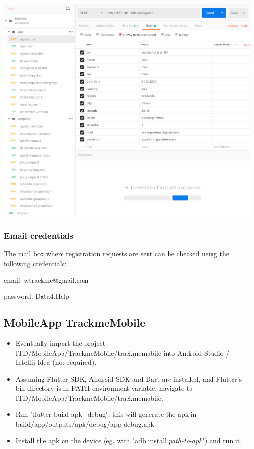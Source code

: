 \documentclass[../main.tex]{subfiles}
\begin{document}
\includegraphics[width = \linewidth ]{images/postman_screen.png}

\subsubsection{Email credentials}
The mail box where registration requests are sent can be checked using the following credentials:
\begin{description}
	\item email: wtrackme@gmail.com
	\item password: Data4.Help 
\end{description}


\subsection{MobileApp TrackmeMobile}

\begin{itemize}
	\item Eventually import the project ITD/MobileApp/TrackmeMobile/trackmemobile into Android Studio / Intellij Idea (not required).
	\item Assuming Flutter SDK, Android SDK and Dart are installed, and Flutter's bin directory is in PATH environment variable, navigate to ITD/MobileApp/TrackmeMobile/trackmemobile.
	\item Run "flutter build apk --debug"; this will generate the apk in build/app/outputs/apk/debug/app-debug.apk
	\item Install the apk on the device (eg. with "adb install \textit{path-to-apk}") and run it.
\end{itemize}
\end{document}
